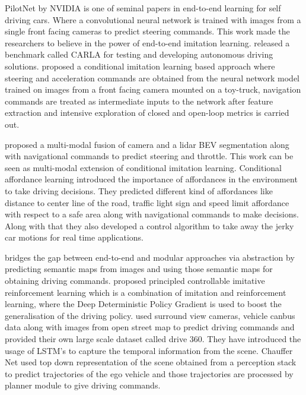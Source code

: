 \cite{DBLP:journals/corr/BojarskiTDFFGJM16} PilotNet by NVIDIA is one of seminal papers in end-to-end learning for self driving cars. Where a convolutional neural network is trained with images from a single front facing cameras to predict steering commands.  This work made the researchers to believe in the power of end-to-end imitation learning. \cite{DBLP:journals/corr/abs-1711-03938} released a benchmark called CARLA for testing and developing autonomous driving solutions. \cite{DBLP:journals/corr/abs-1710-02410} proposed a conditional imitation learning based approach where steering and acceleration commands are obtained from the neural network model trained on images from a front facing camera mounted on a toy-truck, navigation commands are treated as intermediate inputs to the network after feature extraction and intensive exploration of closed and open-loop metrics is carried out.

\cite{Sobh2018EndToEndMS} proposed a multi-modal fusion of camera and a lidar BEV segmentation along with navigational commands to predict steering and throttle. This work can be seen as multi-modal extension of conditional imitation learning. Conditional affordance learning \cite{DBLP:journals/corr/abs-1806-06498} introduced the importance of affordances in the environment to take driving decisions. They predicted different kind of affordances like distance to center line of the road, traffic light sign and speed limit affordance with respect to a safe area along with navigational commands to make decisions. Along with that they also developed a control algorithm to take away the jerky car motions for real time applications. 

\cite{DBLP:journals/corr/abs-1804-09364} bridges the gap between end-to-end and modular approaches via abstraction by predicting semantic maps from images and using those semantic maps for obtaining driving commands. \cite{DBLP:journals/corr/abs-1807-03776} proposed principled controllable imitative reinforcement learning which is a combination of imitation and reinforcement learning, where the Deep Deterministic Policy Gradient is used to boost the generalisation of the driving policy. \cite{DBLP:journals/corr/abs-1803-10158} used surround view cameras, vehicle canbus data along with images from open street map to predict driving commands and provided their own large scale dataset called drive 360. They have introduced the usage of LSTM's to capture the temporal information from the scene. Chauffer Net \cite{DBLP:journals/corr/abs-1812-03079} used top down representation of the scene obtained from a perception stack to predict trajectories of the ego vehicle and those trajectories are processed by planner module to give driving commands. 

